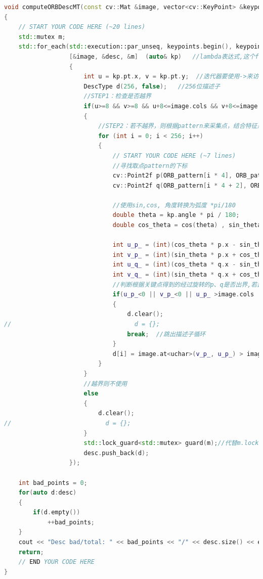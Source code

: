 \documentclass[40pt,a4paper，UTF8]{ctexart}
\numberwithin{equation}{section}
\begin{document}
\begin{lstlisting}[language=C++, caption=computeORB.cpp]
void computeORBDescMT(const cv::Mat &image, vector<cv::KeyPoint> &keypoints, vector<DescType> &desc)
{
    // START YOUR CODE HERE (~20 lines)
    std::mutex m;
    std::for_each(std::execution::par_unseq, keypoints.begin(), keypoints.end(),
                  [&image, &desc, &m]  (auto& kp)   //lambda表达式,这个function函数接受迭代器
                  {
                      int u = kp.pt.x, v = kp.pt.y;  //迭代器要使用->来访问成员（将解引用和成员访问.结合在一起）
                      DescType d(256, false);   //256位描述子
                      //STEP1：检查是否越界
                      if(u>=8 && v>=8 && u+8<=image.cols && v+8<=image.rows)
                      {
                          //STEP2：若不越界，则根据pattern来采集点，结合特征点的方向角theta来旋转点p，q->p',q'，计算p',q'的坐标，并比较大小，结果作为该位描述子的结果(0 or 1)
                          for (int i = 0; i < 256; i++)
                          {
                              // START YOUR CODE HERE (~7 lines)
                              //寻找取点pattern的下标
                              cv::Point2f p(ORB_pattern[i * 4], ORB_pattern[i * 4 + 1]);
                              cv::Point2f q(ORB_pattern[i * 4 + 2], ORB_pattern[i * 4 + 3]);

                              //使用sin,cos, 角度转换为弧度 *pi/180
                              double theta = kp.angle * pi / 180;
                              double cos_theta = cos(theta) , sin_theta = sin(theta);

                              int u_p_ = (int)(cos_theta * p.x - sin_theta * p.y) + u;
                              int v_p_ = (int)(sin_theta * p.x + cos_theta * p.y) + v;
                              int u_q_ = (int)(cos_theta * q.x - sin_theta * q.y) + u;
                              int v_q_ = (int)(sin_theta * q.x + cos_theta * q.y) + v;
                              //判断根据关键点得到的经过旋转的p、q是否出界,若出界，则该描述子清空作废
                              if(u_p_<0 || v_p_<0 || u_p_ >image.cols || v_p_ > image.rows || u_q_<0 || v_q_<0 || u_q_ >image.cols || v_q_ > image.rows)
                              {
                                  d.clear();
//                                  d = {};
                                  break;  //跳出描述子循环
                              }
                              d[i] = image.at<uchar>(v_p_, u_p_) > image.at<uchar>(v_q_, u_q_) ? false : true;  //前者大取false，后者大取true，vector随机访问器，不够快，但是掌握算法是关键
                          }
                      }
                      //越界则不使用
                      else
                      {
                          d.clear();
//                          d = {};
                      }
                      std::lock_guard<std::mutex> guard(m);//代替m.lock; m.unlock();
                      desc.push_back(d);
                  });

    int bad_points = 0;
    for(auto d:desc)
    {
        if(d.empty())
            ++bad_points;
    }
    cout << "Desc bad/total: " << bad_points << "/" << desc.size() << endl;
    return;
    // END YOUR CODE HERE
}

\end{lstlisting}
\end{document}
